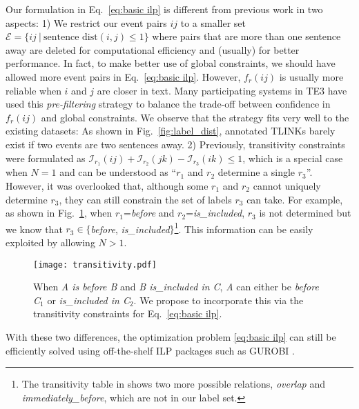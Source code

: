 \documentclass[11pt,letterpaper]{article}
\newcommand{\final}[1]{#1}
\begin{document}
Our formulation in Eq.~\eqref{eq:basic ilp} is different from previous work \citep{ChambersJu08,DoLuRo12} in two aspects: 1) We restrict our event pairs $ij$ to a smaller set \final{$\mathcal{E}=\{ij~|~\textrm{sentence dist$(i,j)$$\le 1$}\}$} where \final{pairs that are} more than one sentence away are deleted for computational efficiency and (usually) for better performance. 
\final{In fact, to make better use of global constraints, we should have allowed more event pairs in Eq.~\eqref{eq:basic ilp}. However, $f_r(ij)$ is usually more reliable when $i$ and $j$ are closer in text. Many participating systems in TE3 \citep{uzzaman2013TE3} have used this {\em pre-filtering} strategy to balance the trade-off between confidence in $f_r(ij)$ and global constraints. We observe that the strategy fits very well to the existing datasets:}
As shown in Fig.~\ref{fig:label_dist}, \final{annotated} TLINKs barely exist if two events are two sentences away.
2) Previously, transitivity constraints were formulated as $\mathcal{I}_{r_1}(ij)+\mathcal{I}_{r_2}(jk)-\mathcal{I}_{r_{3}}(ik)\le 1$, which is a special case when $N=1$ and can be understood as ``$r_1$ and $r_2$ determine a single $r_3$''. However, \final{it was overlooked that, although some $r_1$ and $r_2$ cannot uniquely determine $r_3$, they can still constrain the set of labels $r_3$ can take}.
For example, as shown in Fig.~\ref{fig:transitivity}, when $r_1$=\textit{before} and $r_2$=\textit{is\_included}, $r_3$ is not determined but we know \final{that} $r_3\in\{$\textit{before}, \textit{is\_included}$\}$\footnote{The transitivity table in \citet{allen1983maintaining} shows two more possible relations, {\em overlap} and {\em immediately\_before}, which are not in our label set.}. This information can be easily exploited by allowing $N>1$.

\begin{figure}[h]
	\centering
	\texttt{[image: transitivity.pdf]}
	\caption{\small When \textit{A is before B} and \textit{B is\_included in C}, \textit{A} can either be \textit{before} \textit{C$_1$} or \textit{is\_included in C$_2$}. We propose to incorporate this via the transitivity constraints for Eq.~\eqref{eq:basic ilp}.}
	\label{fig:transitivity}
\end{figure}

With these two differences, the optimization problem \eqref{eq:basic ilp} can still be efficiently solved using off-the-shelf ILP packages such as GUROBI \citep{Gurobi}.
	
\end{document}
